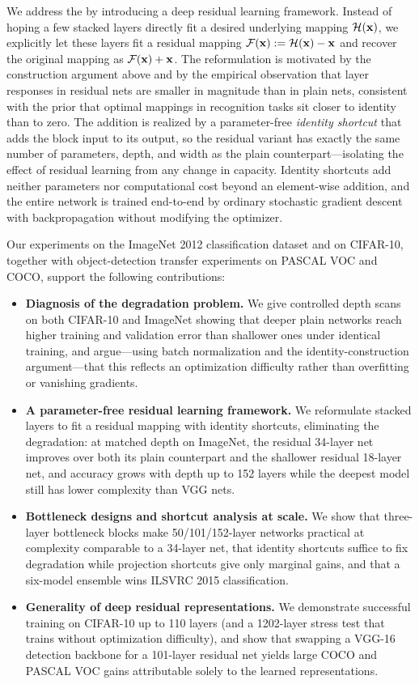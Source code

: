 We address the \degprob by introducing a deep residual learning framework. Instead of
hoping a few stacked layers directly fit a desired underlying mapping $\mathcal{H}(\mathbf{x})$, we
explicitly let these layers fit a residual mapping $\mathcal{F}(\mathbf{x}) := \mathcal{H}(\mathbf{x}) - \mathbf{x}$
and recover the original mapping as $\mathcal{F}(\mathbf{x}) + \mathbf{x}$. The reformulation is motivated
by the construction argument above and by the empirical observation that layer responses
in residual nets are smaller in magnitude than in plain nets, consistent with the prior
that optimal mappings in recognition tasks sit closer to identity than to zero. The
addition is realized by a parameter-free \emph{identity shortcut} that adds the block
input to its output, so the residual variant has exactly the same number of parameters,
depth, and width as the plain counterpart---isolating the effect of residual learning
from any change in capacity. Identity shortcuts add neither parameters nor computational
cost beyond an element-wise addition, and the entire network is trained end-to-end by
ordinary stochastic gradient descent with backpropagation without modifying the
optimizer.

Our experiments on the ImageNet 2012 classification dataset and on CIFAR-10, together
with object-detection transfer experiments on PASCAL VOC and COCO, support the following
contributions:

\begin{itemize}
  \item \textbf{Diagnosis of the degradation problem.} We give controlled depth scans on
        both CIFAR-10 and ImageNet showing that deeper plain networks reach higher
        training and validation error than shallower ones under identical training, and
        argue---using batch normalization and the identity-construction
        argument---that this reflects an optimization difficulty rather than overfitting
        or vanishing gradients.
  \item \textbf{A parameter-free residual learning framework.} We reformulate stacked
        layers to fit a residual mapping with identity shortcuts, eliminating the
        degradation: at matched depth on ImageNet, the residual 34-layer net improves
        over both its plain counterpart and the shallower residual 18-layer net, and
        accuracy grows with depth up to 152 layers while the deepest model still has
        lower complexity than VGG nets.
  \item \textbf{Bottleneck designs and shortcut analysis at scale.} We show that
        three-layer bottleneck blocks make 50/101/152-layer networks practical at
        complexity comparable to a 34-layer net, that identity shortcuts suffice to fix
        degradation while projection shortcuts give only marginal gains, and that a
        six-model ensemble wins ILSVRC 2015 classification.
  \item \textbf{Generality of deep residual representations.} We demonstrate successful
        training on CIFAR-10 up to 110 layers (and a 1202-layer stress test that trains
        without optimization difficulty), and show that swapping a VGG-16 detection
        backbone for a 101-layer residual net yields large COCO and PASCAL VOC gains
        attributable solely to the learned representations.
\end{itemize}
